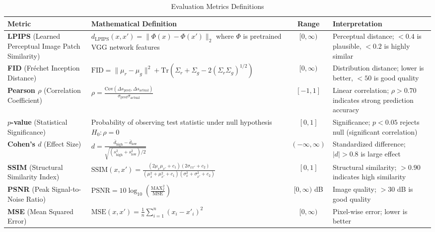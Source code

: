 
\begin{table}[htbp]
\centering
\caption{Evaluation Metrics Definitions}
\label{tab:evaluation_metrics}
\small
\begin{tabularx}{\textwidth}{lXcp{}}
\toprule
\textbf{Metric} & \textbf{Mathematical Definition} & \textbf{Range} & \textbf{Interpretation} \\
\midrule
\textbf{LPIPS} (Learned Perceptual Image Patch Similarity) & $d_{\text{LPIPS}}(x, x') = \|\Phi(x) - \Phi(x')\|_2$ where $\Phi$ is pretrained VGG network features & $[0, \infty)$ & Perceptual distance; $<0.4$ is plausible, $<0.2$ is highly similar \\[6pt]

\textbf{FID} (Fréchet Inception Distance) & $\text{FID} = \|\mu_r - \mu_g\|^2 + \text{Tr}(\Sigma_r + \Sigma_g - 2(\Sigma_r \Sigma_g)^{1/2})$ & $[0, \infty)$ & Distribution distance; lower is better, $<50$ is good quality \\[6pt]

\textbf{Pearson $\rho$} (Correlation Coefficient) & $\rho = \frac{\text{Cov}(\Delta s_{\text{pred}}, \Delta s_{\text{actual}})}{\sigma_{\text{pred}} \sigma_{\text{actual}}}$ & $[-1, 1]$ & Linear correlation; $\rho > 0.70$ indicates strong prediction accuracy \\[6pt]

\textbf{$p$-value} (Statistical Significance) & Probability of observing test statistic under null hypothesis $H_0: \rho = 0$ & $[0, 1]$ & Significance; $p < 0.05$ rejects null (significant correlation) \\[6pt]

\textbf{Cohen's $d$} (Effect Size) & $d = \frac{\bar{d}_{\text{high}} - \bar{d}_{\text{low}}}{\sqrt{(s_{\text{high}}^2 + s_{\text{low}}^2)/2}}$ & $(-\infty, \infty)$ & Standardized difference; $|d| > 0.8$ is large effect \\[6pt]

\textbf{SSIM} (Structural Similarity Index) & $\text{SSIM}(x, x') = \frac{(2\mu_x\mu_{x'} + c_1)(2\sigma_{xx'} + c_2)}{(\mu_x^2 + \mu_{x'}^2 + c_1)(\sigma_x^2 + \sigma_{x'}^2 + c_2)}$ & $[0, 1]$ & Structural similarity; $>0.90$ indicates high similarity \\[6pt]

\textbf{PSNR} (Peak Signal-to-Noise Ratio) & $\text{PSNR} = 10 \log_{10}\left(\frac{\text{MAX}_I^2}{\text{MSE}}\right)$ & $[0, \infty)$ dB & Image quality; $>30$ dB is good quality \\[6pt]

\textbf{MSE} (Mean Squared Error) & $\text{MSE}(x, x') = \frac{1}{n}\sum_{i=1}^{n}(x_i - x'_i)^2$ & $[0, \infty)$ & Pixel-wise error; lower is better \\

\bottomrule
\end{tabularx}
\end{table}

